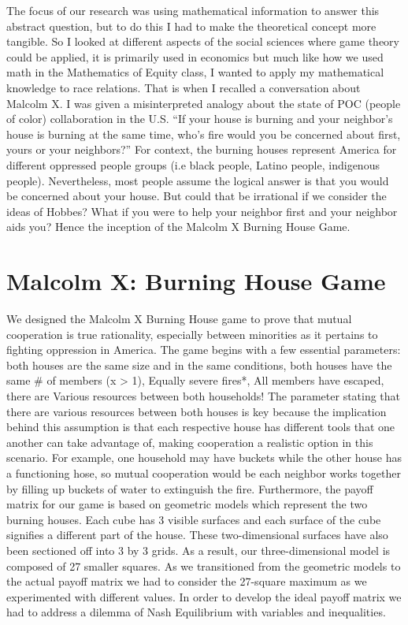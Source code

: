 \documentclass[12pt,twoside]{article}
\begin{document}
The focus of our research was using mathematical information to answer this abstract question, but to do this I had to make the theoretical concept more tangible. So I looked at different aspects of the social sciences where game theory could be applied, it is primarily used in economics but much like how we used math in the Mathematics of Equity class, I wanted to apply my mathematical knowledge to race relations. That is when I recalled a conversation about Malcolm X. I was given a misinterpreted analogy about the state of POC (people of color) collaboration in the U.S. “If your house is burning and your neighbor's house is burning at the same time, who’s fire would you be concerned about first, yours or your neighbors?” For context, the burning houses represent America for different oppressed people groups (i.e black people, Latino people, indigenous people). Nevertheless, most people assume the logical answer is that you would be concerned about your house. But could that be irrational if we consider the ideas of Hobbes? What if you were to help your neighbor first and your neighbor aids you? Hence the inception of the Malcolm X Burning House Game.


\section{Malcolm X: Burning House Game}
We designed the Malcolm X Burning House game to prove that mutual cooperation is true rationality, especially between minorities as it pertains to fighting oppression in America. The game begins with a few essential parameters: both houses are the same size and in the same conditions, both houses have the same # of members (x > 1), Equally severe fires*, All members have escaped, there are Various resources between both households!
The parameter stating that there are various resources between both houses is key because the implication behind this assumption is that each respective house has different tools that one another can take advantage of, making cooperation a realistic option in this scenario. For example, one household may have buckets while the other house has a functioning hose, so mutual cooperation would be each neighbor works together by filling up buckets of water to extinguish the fire. Furthermore, the payoff matrix for our game is based on geometric models which represent the two burning houses. Each cube has 3 visible surfaces and each surface of the cube signifies a different part of the house. These two-dimensional surfaces have also been sectioned off into 3 by 3 grids. As a result, our three-dimensional model is composed of 27 smaller squares. As we transitioned from the geometric models to the actual payoff matrix we had to consider the 27-square maximum as we experimented with different values. In order to develop the ideal payoff matrix we had to address a dilemma of Nash Equilibrium with variables and inequalities.
\end{document}
